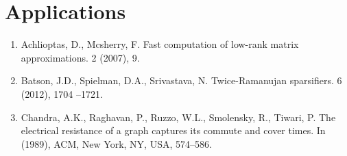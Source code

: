 \documentclass{article}
\begin{document}
\section{Applications}




\begin{enumerate}[1.]
    \item Achlioptas, D., Mcsherry, F. Fast computation of low-rank matrix
        approximations. 2 (2007), 9.

    \item Batson, J.D., Spielman, D.A., Srivastava, N.  Twice-Ramanujan
        sparsifiers. 6 (2012), 1704 –1721.

    \item Chandra, A.K., Raghavan, P., Ruzzo, W.L., Smolensky, R., Tiwari,
        P.  The electrical resistance of a graph captures its commute and
        cover times. In (1989), ACM, New York, NY, USA, 574–586.
\end{enumerate}
\end{document}
